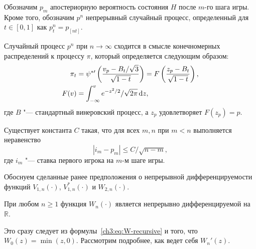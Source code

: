 {Обозначим $p_m$ апостериорную вероятность состояния $H$ после $m$-го шага игры.
Кроме того, обозначим $p^n$ непрерывный случайный процесс, определенный для $t \in [0, 1]$ как $p^n_t = p_{[nt]}$.

\begin{proposition}
  Случайный процесс $p^n$ при $n \rightarrow \infty$ сходится в смысле конечномерных распределений к процессу $\pi$, который определяется следующим образом:
  \begin{align*}
    \pi_t &= \psi^{*\prime} \left(
      \frac{v_p - B_t/\sqrt{3}}{\sqrt{1-t}}
    \right) =
    F\left( \frac{z_p - B_t}{\sqrt{1-t}} \right),\\
    F(v) &= \int_{-\infty}^v e^{-z^2/2}/\sqrt{2\pi} \mathop{}\!\mathrm{d} z,
  \end{align*}
  где $B$ "--- стандартный винеровский процесс, а $z_p$ удовлетворяет $F(z_p) = p$.
\end{proposition}

\begin{proposition}
  Существует константа $C$ такая, что для всех $m, n$ при $m < n$ выполняется неравенство
  \begin{equation*}
    | i_m - p_m | \leq C / \sqrt{n - m},
  \end{equation*}
  где $i_m$ "--- ставка первого игрока на $m$-м шаге игры.
\end{proposition}

Обоснуем сделанные ранее предположения о непрерывной дифференцируемости функций $V_{1,n}(\cdot)$, $V_{1,n}^*(\cdot)$ и $W_{2,n}(\cdot)$.

\begin{proposition}
  При любом $n \geqslant 1$ функция $W_n(\cdot)$ является непрерывно дифференцируемой на $\mathbb{R}$.
\end{proposition}
Это сразу следует из формулы~\eqref{ch3:eq:W-recursive} и того, что $W_0(z) = \min(z, 0)$.
Рассмотрим подробнее, как ведет себя $W_n'(z)$.

}
